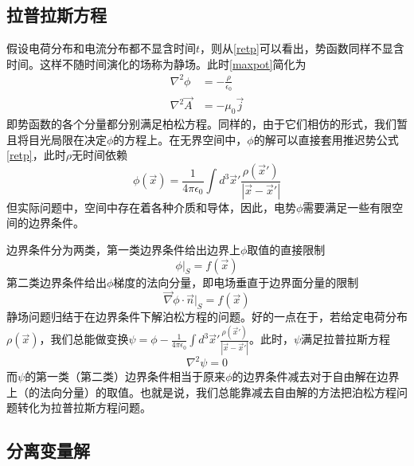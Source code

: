 \documentclass[a4paper,11pt]{ctexart}
\newcommand{\beq}{\begin{equation}}
\newcommand{\eeq}{\end{equation}}
\newcommand{\bea}{\begin{equation}\begin{aligned}}
\newcommand{\eea}{\end{aligned}\end{equation}}
\newcommand{\del}{\vec{\nabla}}
\newcommand{\epv}{\epsilon_0}
\begin{document}
\subsection{拉普拉斯方程}
假设电荷分布和电流分布都不显含时间$t$，则从\cref{retp}可以看出，势函数同样不显含时间。这样不随时间演化的场称为静场。此时\cref{maxpot}简化为
\bea
\nabla^2 \phi &= - \frac{\rho}{\epv}\\
\nabla^2 \vec A &= - \mu_0 \vec j
\eea
即势函数的各个分量都分别满足柏松方程。同样的，由于它们相仿的形式，我们暂且将目光局限在决定$\phi$的方程上。在无界空间中，$\phi$的解可以直接套用推迟势公式\cref{retp}，此时$\rho$无时间依赖
\beq
\phi(\vec{x}) = \frac{1}{4\pi \epv} \int d^3 \vec{x}' \frac{\rho(\vec{x}')}{\left|\vec{x} - \vec{x}'\right|}
\eeq
但实际问题中，空间中存在着各种介质和导体，因此，电势$\phi$需要满足一些有限空间的边界条件。
\par
边界条件分为两类，第一类边界条件给出边界上$\phi$取值的直接限制
\beq
\phi \big|_{S} = f(\vec{x})
\eeq
第二类边界条件给出$\phi$梯度的法向分量，即电场垂直于边界面分量的限制
\beq
\del \phi \cdot \vec{n} \big|_S= f(\vec{x})
\eeq
静场问题归结于在边界条件下解泊松方程的问题。好的一点在于，若给定电荷分布$\rho(\vec{x})$，我们总能做变换$\psi = \phi - \frac{1}{4\pi \epv} \int d^3 \vec{x}' \frac{\rho(\vec{x}')}{\left|\vec{x} - \vec{x}'\right|}$。此时，$\psi$满足拉普拉斯方程
\beq
\nabla^2 \psi = 0
\eeq
而$\psi$的第一类（第二类）边界条件相当于原来$\phi$的边界条件减去对于自由解在边界上（的法向分量）的取值。也就是说，我们总能靠减去自由解的方法把泊松方程问题转化为拉普拉斯方程问题。

\subsection{分离变量解}
\end{document}

